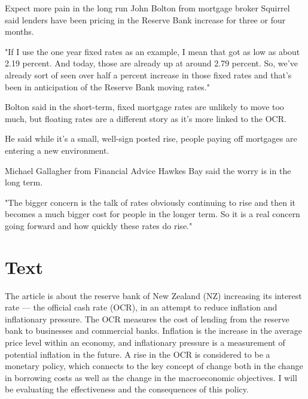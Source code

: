 \documentclass[a4paper,12pt]{article}
\begin{document}
Expect more pain in the long run
John Bolton from mortgage broker Squirrel said lenders have been pricing in the Reserve Bank increase for three or four months.

"If I use the one year fixed rates as an example, I mean that got as low as about 2.19 percent. And today, those are already up at around 2.79 percent. So, we've already sort of seen over half a percent increase in those fixed rates and that's been in anticipation of the Reserve Bank moving rates."

Bolton said in the short-term, fixed mortgage rates are unlikely to move too much, but floating rates are a different story as it's more linked to the OCR.

He said while it's a small, well-sign posted rise, people paying off mortgages are entering a new environment.

Michael Gallagher from Financial Advice Hawkes Bay said the worry is in the long term.

"The bigger concern is the talk of rates obviously continuing to rise and then it becomes a much bigger cost for people in the longer term. So it is a real concern going forward and how quickly these rates do rise."

\newpage

\section*{Text}

The article is about the reserve bank of New Zealand (NZ) increasing its interest rate --- the official cash rate (OCR), in an attempt to reduce inflation and inflationary pressure. The OCR measures the cost of lending from the reserve bank to businesses and commercial banks. Inflation is the increase in the average price level within an economy, and inflationary pressure is a measurement of potential inflation in the future. A rise in the OCR is considered to be a monetary policy, which connects to the key concept of change both in the change in borrowing costs as well as the change in the macroeconomic objectives. I will be evaluating the effectiveness and the consequences of this policy.
\end{document}
